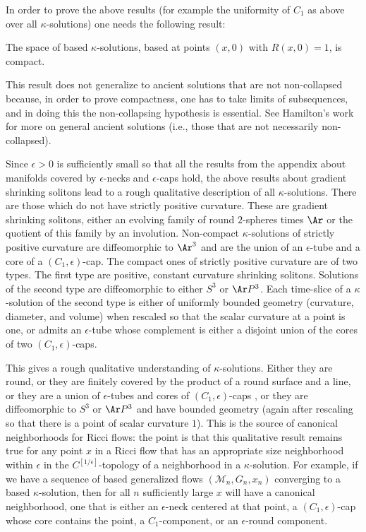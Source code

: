 In order to prove the above results (for example the uniformity of $C_1$ as
above over all $\kappa$-solutions)  one needs the following result:
\begin{theorem}
\label{thm:compactness-kappa-solutions}
The space of based $\kappa$-solutions,  based at points $(x,0)$ with
$R(x,0)=1$, is compact.
\end{theorem}

This result does not generalize to ancient solutions that are not
non-collapsed because, in order to prove compactness, one has to
take limits of subsequences, and in doing this the non-collapsing
hypothesis is essential. See Hamilton's work \cite{Hamiltonsurvey}
for more on general ancient solutions (i.e., those that are not
necessarily non-collapsed).

Since $\epsilon>0$ is sufficiently small so that all the results from the
appendix about manifolds covered by $\epsilon$-necks and $\epsilon$-caps hold,
the above results about gradient shrinking solitons lead to a rough qualitative
description of all $\kappa$-solutions. There are those which do not have
strictly positive curvature. These are gradient shrinking solitons, either an
evolving family of round $2$-spheres times $\Ar$ or the quotient of this family
by an involution. Non-compact $\kappa$-solutions of strictly positive curvature
are diffeomorphic to $\Ar^3$ and are the union of an $\epsilon$-tube and a core
of a $(C_1,\epsilon)$-cap. The compact ones of strictly positive curvature are
of two types. The first type are positive, constant curvature shrinking
solitons. Solutions of the second type are diffeomorphic to either $S^3$ or
$\Ar P^3$. Each time-slice of a $\kappa$-solution of the second type is either
of uniformly bounded geometry (curvature, diameter, and volume) when rescaled
so that the scalar curvature at a point is one, or admits an $\epsilon$-tube
whose complement is either a disjoint union of the cores of two
$(C_1,\epsilon)$-caps.


This gives a rough qualitative understanding of  $\kappa$-solutions. Either
they are round, or they are finitely covered by the product of a round surface
and a line, or they are a union of $\epsilon$-tubes and cores of
$(C_1,\epsilon)$-caps , or they are diffeomorphic to $S^3$ or $\Ar P^3$ and
have bounded geometry (again after rescaling so that there is a point of scalar
curvature $1$). This is the source of canonical neighborhoods for Ricci flows:
 the point is that this qualitative result remains true for any point $x$ in a
Ricci flow that has an appropriate size neighborhood within
$\epsilon$ in the $C^{[1/\epsilon]}$-topology of a neighborhood in a
$\kappa$-solution. For example, if we have a sequence of based
generalized flows $({\mathcal M}_n,G_n,x_n)$ converging to a based
$\kappa$-solution, then for all $n$ sufficiently large $x$ will have
a canonical neighborhood, one that is either an $\epsilon$-neck
centered at that point, a $(C_1,\epsilon)$-cap whose core contains
the point, a $C_1$-component, or an $\epsilon$-round component.

